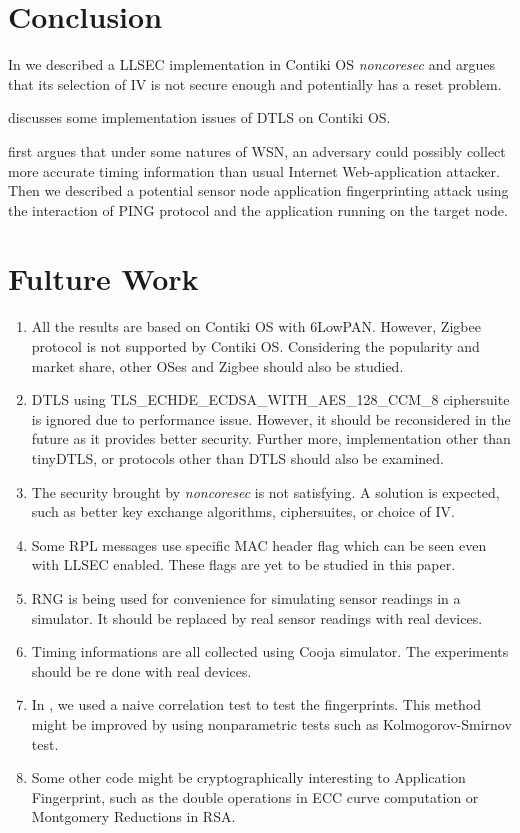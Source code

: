 \chapter{Conclusion}

In  we described a LLSEC implementation in Contiki OS \textit{noncoresec} and argues that its selection of IV is not secure enough and potentially has a reset problem.

 discusses some implementation issues of DTLS on Contiki OS.

 first argues that under some natures of WSN, an adversary could possibly collect more accurate timing information than usual Internet Web-application attacker. Then we described a potential sensor node application fingerprinting attack using the interaction of PING protocol and the application running on the target node.

\chapter{Fulture Work}
\begin{enumerate}
\item All the results are based on Contiki OS with 6LowPAN. However, Zigbee\cite{Zigbee} protocol is not supported by Contiki OS. Considering the popularity and market share, other OSes and Zigbee should also be studied.

\item DTLS using TLS\_ECHDE\_ECDSA\_WITH\_AES\_128\_CCM\_8 ciphersuite is ignored due to performance issue. However, it should be reconsidered in the future as it provides better security. Further more, implementation other than tinyDTLS, or protocols other than DTLS should also be examined.

\item The security brought by \textit{noncoresec} is not satisfying. A solution is expected, such as better key exchange algorithms, ciphersuites, or choice of IV.

\item Some RPL messages use specific MAC header flag which can be seen even with LLSEC enabled. These flags are yet to be studied in this paper.

\item RNG is being used for convenience for simulating sensor readings in a simulator. It should be replaced by real sensor readings with real devices.

\item Timing informations are all collected using Cooja simulator. The experiments should be re done with real devices.

\item In , we used a naive correlation test to test the fingerprints. This method might be improved by using nonparametric tests such as Kolmogorov-Smirnov test.

\item Some other code might be cryptographically interesting to Application Fingerprint, such as the double operations in ECC curve computation or Montgomery Reductions in RSA.
\end{enumerate}